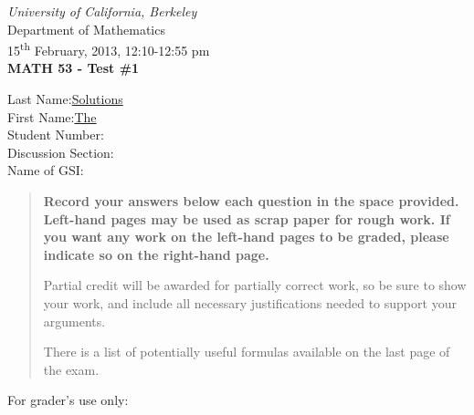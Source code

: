 \documentclass[12pt]{article}
\newcommand{\skipline}{\vspace{12pt}}
\begin{document}
\author{Instructor: Sean Fitzpatrick}
\thispagestyle{plain}
\begin{center}
\emph{University of California, Berkeley}\\
Department of Mathematics\\
15\textsuperscript{th} February, 2013, 12:10-12:55 pm\\
{\bf MATH 53 - Test \#1}\\
\end{center}
\skipline \skipline \skipline \noindent \skipline
Last Name:\underline{\hspace{100pt}Solutions\hspace{200pt}}\\
\skipline
First Name:\underline{\hspace{100pt}The\hspace{225pt}}\\
\skipline
Student Number:\underline{\hspace{322pt}}\\
\skipline
Discussion Section: \underline{\hspace{307pt}}\\
\skipline
Name of GSI: \underline{\hspace{336pt}}\\

\vspace{0.5in}


\begin{quote}
 {\bf Record your answers below each question in the space provided.    Left-hand pages may be used as scrap paper for rough work.  If you want any work on the left-hand pages to be graded, please indicate so on the right-hand page.
 
 \bigskip
 
Partial credit will be awarded for partially correct work, so be sure to show your work, and include all necessary justifications needed to support your arguments. 

There is a list of potentially useful formulas available on the last page of the exam.}
\end{quote}


\vspace{0.5in}

For grader's use only:
\end{document}
